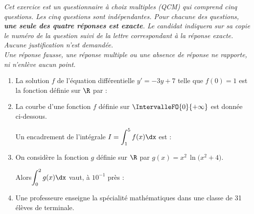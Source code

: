 \textit{Cet exercice est un questionnaire à choix multiples (QCM) qui comprend cinq questions. Les cinq questions sont indépendantes. Pour chacune des questions, \textbf{une seule des quatre réponses est exacte}. Le candidat indiquera sur sa copie le numéro de la question suivi de la lettre correspondant à la réponse exacte.\\
Aucune justification n'est demandée.\\
Une réponse fausse, une réponse multiple ou une absence de réponse ne rapporte, ni n'enlève aucun point.}

\begin{enumerate}
	\item La solution $f$ de l'équation différentielle $y'=-3y+7$ telle que $f(0)=1$ est la fonction définie sur $\R$ par :
	
	\smallskip
	
	\item La courbe d'une fonction $f$ définie sur $\IntervalleFO{0}{+\infty}$ est donnée ci-dessous.
	
	\begin{Centrage}
		\begin{GraphiqueTikz}[x=1.5cm,y=1.5cm,Xmin=0,Xmax=6,Xgrille=1,Xgrilles=1,Ymin=0,Ymax=4,Ygrille=1,Ygrilles=1]
		\end{GraphiqueTikz}
	\end{Centrage}
	
	Un encadrement de l'intégrale $I = \displaystyle\int_1^5 f(x) \dx$ est :
	
	\smallskip
	
	\item On considère la fonction $g$ définie sur $\R$ par $g(x)=x^2\,\ln\big(x^2+4\big)$.
	
	Alors$\displaystyle\int_0^2 g(x) \dx$ vaut, à $10^{-1}$ près :
	
	\smallskip
	
	\item Une professeure enseigne la spécialité mathématiques dans une classe de 31 élèves de terminale.
	

\end{enumerate}
